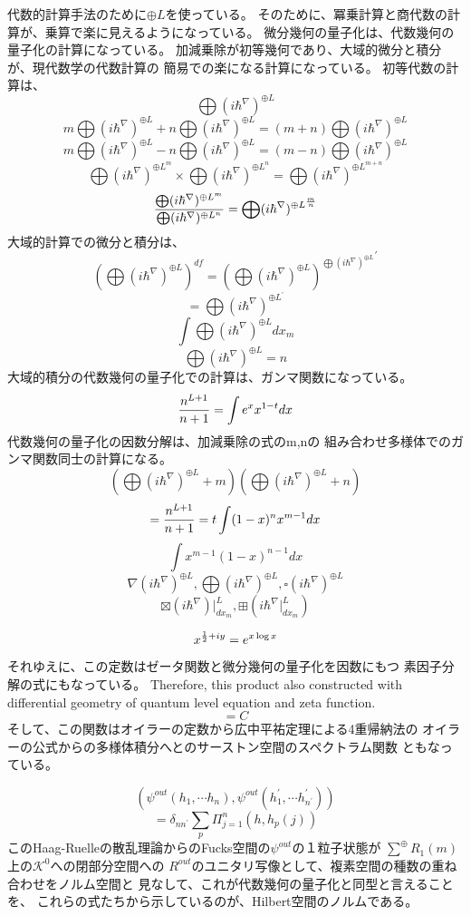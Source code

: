 \documentclass{jsarticle}
\begin{document}
         代数的計算手法のために$ \oplus L $を使っている。
そのために、冪乗計算と商代数の計算が、乗算で楽に見えるようになっている。
            微分幾何の量子化は、代数幾何の量子化の計算になっている。
  加減乗除が初等幾何であり、大域的微分と積分が、現代数学の代数計算の
  簡易での楽になる計算になっている。
  初等代数の計算は、
  $$ \bigoplus({i \hbar^{\nabla}})^{\oplus L} $$
   $$m \bigoplus({i \hbar^{\nabla}})^{\oplus L} +  
   n\bigoplus({i \hbar^{\nabla}})^{\oplus L} = 
   (m+n) \bigoplus({i \hbar^{\nabla}})^{\oplus L}   $$
   $$ m\bigoplus({i \hbar^{\nabla}})^{\oplus L} -  
   n\bigoplus({i \hbar^{\nabla}})^{\oplus L} = 
   (m-n) \bigoplus({i \hbar^{\nabla}})^{\oplus L}   $$
   $$ \bigoplus({i \hbar^{\nabla}})^{{\oplus L}^m} \times 
      \bigoplus({i \hbar^{\nabla}})^{{\oplus L}^n} =
   \bigoplus({i \hbar^{\nabla}})^{\oplus L^{m+n}} $$
  $$ {{\bigoplus({i \hbar^{\nabla}})^{\oplus L^m}}  \over  
  {\bigoplus({i \hbar^{\nabla}})^{\oplus L^n}}} =  
  \bigoplus({i \hbar^{\nabla}})^{\oplus L^{m\over n}} $$
  大域的計算での微分と積分は、
  $$ \left(\bigoplus({i \hbar^{\nabla}})^{\oplus L}\right)^{df}
  =  {\left(\bigoplus({i \hbar^{\nabla}})^{\oplus L}\right)^{
	  \bigoplus({i \hbar^{\nabla}})^{\oplus L}}}^{'}  $$
  $$ = \bigoplus({i \hbar^{\nabla}})^{\oplus L^{'}} $$
   $$ \int \bigoplus({i \hbar^{\nabla}})^{\oplus L} dx_m $$
   $$ \bigoplus({i \hbar^{\nabla}})^{\oplus L} = n $$
   大域的積分の代数幾何の量子化での計算は、ガンマ関数になっている。
   $$ {n^{L+1} \over {n+1}} = \int e^x x^{1 - t} dx $$
   代数幾何の量子化の因数分解は、加減乗除の式のm,nの
   組み合わせ多様体でのガンマ関数同士の計算になる。
   $$ \left(\bigoplus({i \hbar^{\nabla}})^{\oplus L}+m\right) 
   \left(\bigoplus({i \hbar^{\nabla}})^{\oplus L}+n\right) $$
  $$ = {n^{L+1} \over {n+1}} = t \int (1 - x)^n x^{m - 1} dx $$
  $$ \int x^{m-1}(1 - x)^{n-1} dx $$
  $$ \nabla ({i \hbar^{\nabla}})^{\oplus L}, \bigoplus ({i \hbar^{\nabla}})^{
	   \oplus L}, \square ({i \hbar^{\nabla}})^{\oplus L} $$
   $$ \boxtimes (i \hbar^{\nabla})|_{dx_m}^L, \boxplus (i \hbar^{\nabla}|_
   {dx_m}^L) $$



  $$ x^{{1 \over 2} + iy} = e^{x \log x} $$
  それゆえに、この定数はゼータ関数と微分幾何の量子化を因数にもつ
  素因子分解の式にもなっている。
  Therefore, this product also constructed with differential geometry
  of quantum level equation and zeta function.
  $$ = C $$ 
  そして、この関数はオイラーの定数から広中平祐定理による4重帰納法の
  オイラーの公式からの多様体積分へとのサーストン空間のスペクトラム関数
  ともなっている。
 
  $$ (\psi^{out}(h_1, \dotsb h_n), \psi^{out}(h^{'}_1, \dotsb h^{'}_{{n^{'}}}
  )) $$
  $$ = \delta_{n n^{'}} \sum_{p} \Pi^{n}_{j=1} (h,h_{p}(
  j)) $$
  このHaag-Ruelleの散乱理論からのFucks空間の$ \psi^{out} $の１粒子状態が
  $\sum^{\oplus}R_1(m)$上の$\mathcal{K^{0}}$への閉部分空間への
  $R^{out}$のユニタリ写像として、複素空間の種数の重ね合わせをノルム空間と
  見なして、これが代数幾何の量子化と同型と言えることを、
  これらの式たちから示しているのが、Hilbert空間のノルムである。　
\end{document}
